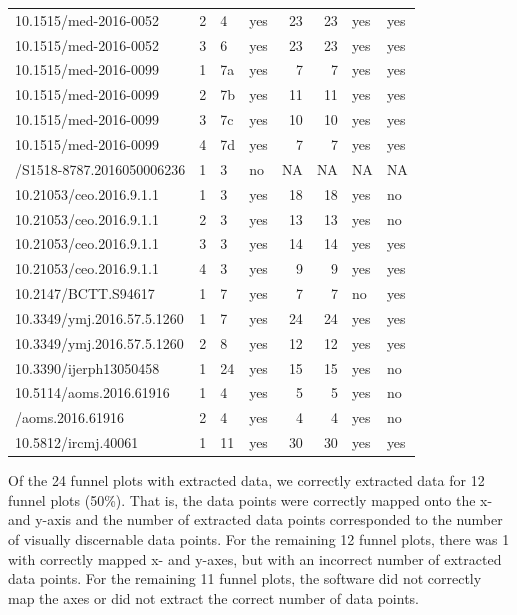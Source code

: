 \documentclass[a5paper]{book}
\begin{document}
\begin{landscape}
\begin{table}[t]
{\begin{tabular}{lrllrrll}
10.1515/med-2016-0052 & 2 & 4 & yes & 23 & 23 & yes & yes\\
\addlinespace
\rowcolor{gray!6}  10.1515/med-2016-0052 & 3 & 6 & yes & 23 & 23 & yes & yes\\
10.1515/med-2016-0099 & 1 & 7a & yes & 7 & 7 & yes & yes\\
\rowcolor{gray!6}  10.1515/med-2016-0099 & 2 & 7b & yes & 11 & 11 & yes & yes\\
10.1515/med-2016-0099 & 3 & 7c & yes & 10 & 10 & yes & yes\\
\rowcolor{gray!6}  10.1515/med-2016-0099 & 4 & 7d & yes & 7 & 7 & yes & yes\\
\addlinespace
10.1590/S1518-8787.2016050006236 & 1 & 3 & no & NA & NA & NA & NA\\
\rowcolor{gray!6}  10.21053/ceo.2016.9.1.1 & 1 & 3 & yes & 18 & 18 & yes & no\\
10.21053/ceo.2016.9.1.1 & 2 & 3 & yes & 13 & 13 & yes & no\\
\rowcolor{gray!6}  10.21053/ceo.2016.9.1.1 & 3 & 3 & yes & 14 & 14 & yes & yes\\
10.21053/ceo.2016.9.1.1 & 4 & 3 & yes & 9 & 9 & yes & yes\\
\addlinespace
\rowcolor{gray!6}  10.2147/BCTT.S94617 & 1 & 7 & yes & 7 & 7 & no & yes\\
10.3349/ymj.2016.57.5.1260 & 1 & 7 & yes & 24 & 24 & yes & yes\\
\rowcolor{gray!6}  10.3349/ymj.2016.57.5.1260 & 2 & 8 & yes & 12 & 12 & yes & yes\\
10.3390/ijerph13050458 & 1 & 24 & yes & 15 & 15 & yes & no\\
\rowcolor{gray!6}  10.5114/aoms.2016.61916 & 1 & 4 & yes & 5 & 5 & yes & no\\
\addlinespace
10.5114/aoms.2016.61916 & 2 & 4 & yes & 4 & 4 & yes & no\\
\rowcolor{gray!6}  10.5812/ircmj.40061 & 1 & 11 & yes & 30 & 30 & yes & yes\\
\bottomrule
\end{tabular}}
\end{table}
\end{landscape}

Of the 24 funnel plots with extracted data, we correctly extracted data
for 12 funnel plots (50\%). That is, the data points were correctly
mapped onto the x- and y-axis and the number of extracted data points
corresponded to the number of visually discernable data points. For the
remaining 12 funnel plots, there was 1 with correctly mapped x- and
y-axes, but with an incorrect number of extracted data points. For the
remaining 11 funnel plots, the software did not correctly map the axes
or did not extract the correct number of data points.
\end{document}
